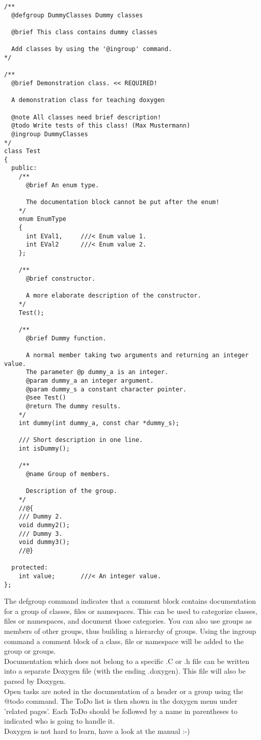 \documentclass[a4]{article}
\begin{document}
\begin{verbatim}
/**
  @defgroup DummyClasses Dummy classes
	
  @brief This class contains dummy classes
	
  Add classes by using the '@ingroup' command. 
*/

/**
  @brief Demonstration class. << REQUIRED!
  
  A demonstration class for teaching doxygen
  
  @note All classes need brief description!
  @todo Write tests of this class! (Max Mustermann)
  @ingroup DummyClasses
*/
class Test
{
  public:
    /** 
      @brief An enum type. 
      
      The documentation block cannot be put after the enum! 
    */
    enum EnumType
    {
      int EVal1,     ///< Enum value 1.
      int EVal2      ///< Enum value 2.
    };
    
    /**
      @brief constructor.
      
      A more elaborate description of the constructor.
    */
    Test();

    /** 
      @brief Dummy function.
      
      A normal member taking two arguments and returning an integer value.
      The parameter @p dummy_a is an integer.
      @param dummy_a an integer argument.
      @param dummy_s a constant character pointer.
      @see Test()
      @return The dummy results.
    */
    int dummy(int dummy_a, const char *dummy_s);
    
    /// Short description in one line.
    int isDummy();

    /** 
      @name Group of members.
      
      Description of the group.
    */
    //@{
    /// Dummy 2.
    void dummy2();
    /// Dummy 3.
    void dummy3();
    //@}
    
  protected:
    int value;       ///< An integer value.
};
\end{verbatim}
The defgroup command indicates that a comment block contains documentation for a group of classes, files or namespaces.
This can be used to categorize classes, files or namespaces, and document those categories. 
You can also use groups as members of other groups, thus building a hierarchy of groups. 
Using the ingroup command a comment block of a class, file or namespace will be added to the group or groups.\\
Documentation which does not belong to a specific .C or .h file can be written into a 
separate Doxygen file (with the ending .doxygen). This file will also be parsed by Doxygen.\\
Open tasks are noted in the documentation of a header or a group using the @todo command.
The ToDo list is then shown in the doxygen menu under 'related pages'. Each ToDo should be
followed by a name in parentheses to indicated who is going to handle it.\\
Doxygen is not hard to learn, have a look at the manual :-)
\end{document}
